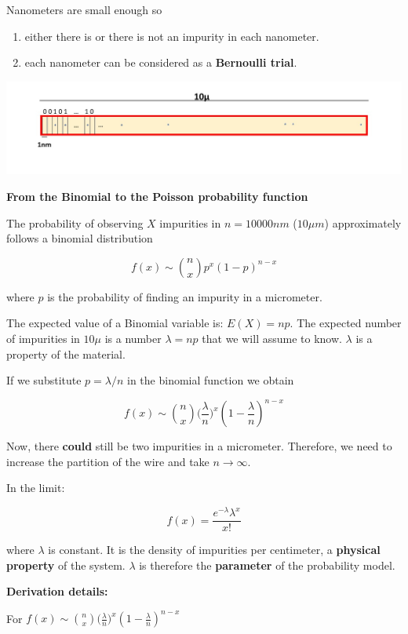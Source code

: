 \documentclass[
]{book}
\begin{document}
Nanometers are small enough so

\begin{enumerate}
\def\labelenumi{\arabic{enumi})}
\item
  either there is or there is not an impurity in each nanometer.
\item
  each nanometer can be considered as a \textbf{Bernoulli trial}.
\end{enumerate}

\includegraphics{./figures/Pois.JPG}

\textbf{From the Binomial to the Poisson probability function}

The probability of observing \(X\) impurities in \(n=10000nm\) (\(10\mu m\)) approximately follows a binomial distribution

\[f(x) \sim \binom n x p^x(1-p)^{n-x}\]

where \(p\) is the probability of finding an impurity in a micrometer.

The expected value of a Binomial variable is:
\(E(X)=np\). The expected number of impurities in \(10\mu\) is a number \(\lambda=np\) that we will assume to know. \(\lambda\) is a property of the material.

If we substitute \(p=\lambda/n\) in the binomial function we obtain

\[f(x) \sim \binom n x \big(\frac{\lambda}{n}\big)^x(1-\frac{\lambda}{n})^{n-x}\]

Now, there \textbf{could} still be two impurities in a micrometer. Therefore, we need to increase the partition of the wire and take \(n \rightarrow \infty\).

In the limit:

\[f(x)= \frac{e^{-\lambda}\lambda^x}{x!}\]

where \(\lambda\) is constant. It is the density of impurities per centimeter, a \textbf{physical property} of the system. \(\lambda\) is therefore the \textbf{parameter} of the probability model.

\textbf{Derivation details:}

For \(f(x) \sim \binom n x \big(\frac{\lambda}{n}\big)^x(1-\frac{\lambda}{n})^{n-x}\)
\end{document}
